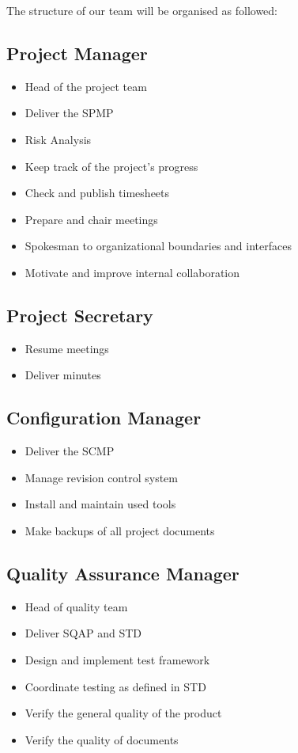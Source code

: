 \documentclass[salesmen, twoside]{../../../templates/latex/2009/softproj}
\begin{document}
\begin{projdoc}
		The structure of our team will be organised as followed:
		
		\subsection{Project Manager}
			\begin{itemize}
				\item Head of the project team
				\item Deliver the SPMP
				\item Risk Analysis
				\item Keep track of the project's progress
				\item Check and publish timesheets
				\item Prepare and chair meetings
				\item Spokesman to organizational boundaries and interfaces
				\item Motivate and improve internal collaboration
			\end{itemize}
			
		\subsection{Project Secretary}
			\begin{itemize}
				\item Resume meetings
				\item Deliver minutes
			\end{itemize}
			
		\subsection{Configuration Manager}
			\begin{itemize}
				\item Deliver the SCMP
				\item Manage revision control system
				\item Install and maintain used tools
				\item Make backups of all project documents
			\end{itemize}
			
		\subsection{Quality Assurance Manager}
			\begin{itemize}
					\item Head of quality team
					\item Deliver SQAP and STD
					\item Design and implement test framework
					\item Coordinate testing as defined in STD
					\item Verify the general quality of the product
					\item Verify the quality of documents
			\end{itemize}
			

\end{projdoc}
\end{document}
